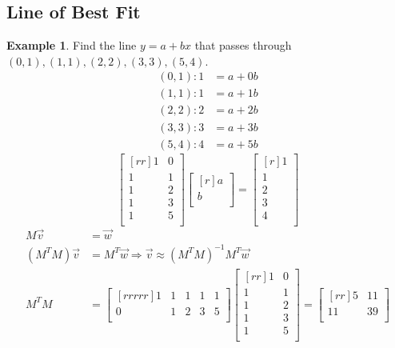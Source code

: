 \documentclass{report}
\theoremstyle{plain}
\theoremstyle{definition}
\newtheorem*{ex}{Example}
\theoremstyle{plain}
\begin{document}
\subsection{Line of Best Fit}
\begin{ex}
Find the line $y=a+bx$ that passes through $(0,1),(1,1),(2,2),(3,3),(5,4)$.\\
\begin{align*}
(0,1): 1&=a+0b\\
(1,1): 1&=a+1b\\
(2,2): 2&=a+2b\\
(3,3): 3&=a+3b\\
(5,4): 4&=a+5b
\end{align*}
\[ \begin{bmatrix}[rr]1&0\\1&1\\1&2\\1&3\\1&5\\\end{bmatrix}\begin{bmatrix}[r]a\\b\\\end{bmatrix}=\begin{bmatrix}[r]1\\1\\2\\3\\4\\\end{bmatrix} \]
\begin{align*}
M\vec{v}&=\vec{w}\\
(M^TM)\vec{v}&=M^T\vec{w}\Rightarrow \vec{v}\approx (M^TM)^{-1}M^T\vec{w}\\
M^TM&=\begin{bmatrix}[rrrrr]1&1&1&1&1\\0&1&2&3&5\\\end{bmatrix}\begin{bmatrix}[rr]1&0\\1&1\\1&2\\1&3\\1&5\\\end{bmatrix}= \begin{bmatrix}[rr]5&11\\11&39\\\end{bmatrix}\\

\end{align*}
\end{ex}
\end{document}
